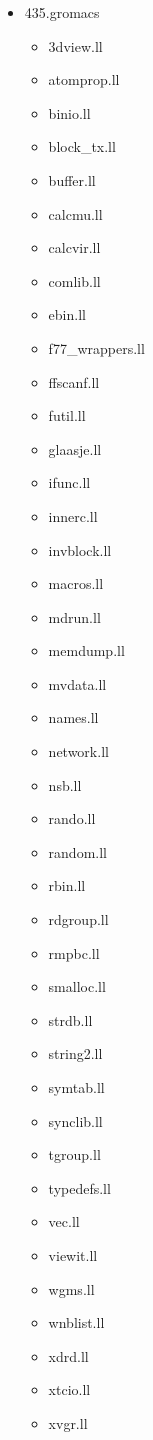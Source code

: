 \begin{multicols}{3}
\begin{itemize}
	\item 435.gromacs
	\begin{itemize}
		\item 3dview.ll
		\item atomprop.ll
		\item binio.ll
		\item block\_tx.ll
		\item buffer.ll
		\item calcmu.ll
		\item calcvir.ll
		\item comlib.ll
		\item ebin.ll
		\item f77\_wrappers.ll
		\item ffscanf.ll
		\item futil.ll
		\item glaasje.ll
		\item ifunc.ll
		\item innerc.ll
		\item invblock.ll
		\item macros.ll
		\item mdrun.ll
		\item memdump.ll
		\item mvdata.ll
		\item names.ll
		\item network.ll
		\item nsb.ll
		\item rando.ll
		\item random.ll
		\item rbin.ll
		\item rdgroup.ll
		\item rmpbc.ll
		\item smalloc.ll
		\item strdb.ll
		\item string2.ll
		\item symtab.ll
		\item synclib.ll
		\item tgroup.ll
		\item typedefs.ll
		\item vec.ll
		\item viewit.ll
		\item wgms.ll
		\item wnblist.ll
		\item xdrd.ll
		\item xtcio.ll
		\item xvgr.ll
	\end{itemize}


\end{itemize}
\end{multicols}
